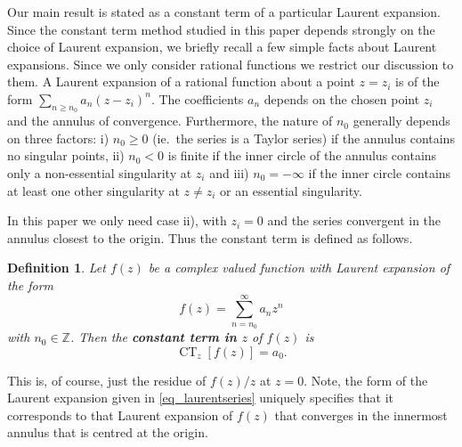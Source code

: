 \documentclass[11pt,a4paper]{article}
\DeclareMathOperator{\CT}{CT}
\newtheorem{definition}{Definition}
\newcommand{\integer}{\mathbb{Z}}
\newcommand{\defin}[1]{\textbf{#1}}		%
\begin{document}
Our  main result is stated as a constant term of a particular Laurent expansion.  Since the constant term method studied in this paper depends strongly on the choice of Laurent expansion, we briefly recall a few simple facts about Laurent expansions. Since we only consider rational functions  we restrict our discussion to them. A Laurent expansion of a rational function about a point   $z=z_i$ is of the form $\sum_{n\ge n_0} a_n(z-z_i)^n$. The coefficients $a_n$ depends  on the chosen point $z_i$ and the annulus of convergence. 
Furthermore, the nature of $n_0$ generally depends on three factors: i) $n_0\ge 0$ (ie.\ the series is a Taylor series) if the annulus contains no singular points, ii) $n_0<0$ is finite if the inner circle of the annulus contains only a non-essential singularity at $z_i$ and iii)  $n_0=-\infty$ if the inner circle contains at least one other singularity at $z\ne z_i$ or an essential singularity. 

In this paper we only need case ii), with $z_i=0$ and the series  convergent in the  annulus closest to the origin.  Thus the constant term is defined as follows.
  
\begin{definition} \label{def:CT} Let $f(z)$ be a complex valued function with Laurent expansion of the form
\begin{equation}
f(z) = \sum_{n=n_0}^{\infty} a_n z^n
\label{eq_laurentseries}
\end{equation}
with $n_0\in\integer$.
Then the \defin{constant term in $z$} of $f(z)$ is
\begin{equation}
\CT_z [f(z)] = a_0.
\end{equation}
\end{definition}  
This is, of course, just the residue of $f(z)/z$ at $z=0$.  Note, the form of the Laurent expansion given in \eqref{eq_laurentseries} uniquely specifies that it corresponds to that Laurent expansion of $f(z)$ that converges in the innermost annulus   that is centred at the origin.  
\end{document}
